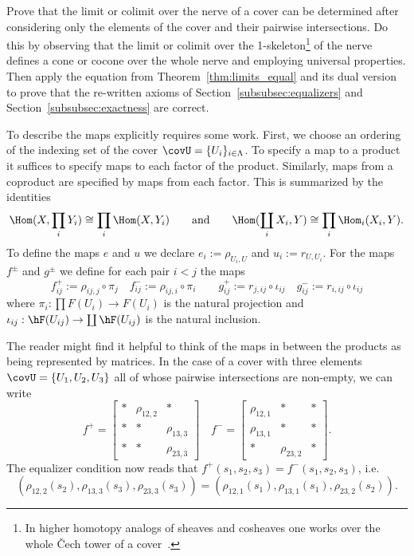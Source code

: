 \begin{exr}
Prove that the limit or colimit over the nerve of a cover can be determined after considering only the elements of the cover and their pairwise intersections. Do this by observing that the limit or colimit over the 1-skeleton\footnote{In higher homotopy analogs of sheaves and cosheaves one works over the whole \v{C}ech tower of a cover~\cite{dugger-hypercovers,douglas2007sheaves,gwilliam-stacks}.} of the nerve defines a cone or cocone over the whole nerve and employing universal properties. Then apply the equation from Theorem~\ref{thm:limits_equal} and its dual version to prove that the re-written axioms of Section~\ref{subsubsec:equalizers} and Section~\ref{subsubsec:exactness} are correct.
\end{exr}

To describe the maps explicitly requires some work. First, we choose an ordering of the indexing set of the cover $\covU=\{U_i\}_{i\in\Lambda}$. To specify a map to a product it suffices to specify maps to each factor of the product. Similarly, maps from a coproduct are specified by maps from each factor. This is summarized by the identities 
	\[
	\Hom(X,\prod_i Y_i)\cong \prod_i\Hom(X,Y_i) \qquad \mathrm{and} \qquad \Hom(\coprod_i X_i,Y)\cong\prod_i \Hom_i(X_i,Y).
	\]
To define the maps $e$ and $u$ we declare $e_i:=\rho_{U_i,U}$ and $u_i:=r_{U,U_i}$. For the maps $f^{\pm}$ and $g^{\pm}$ we define for each pair $i<j$ the maps
	\[
	f^+_{ij}:=\rho_{ij,j}\circ\pi_j \quad f^-_{ij}:=\rho_{ij,i}\circ\pi_i \qquad g^+_{ij}:=r_{j,ij}\circ\iota_{ij} \quad g^-_{ij}:=r_{i,ij}\circ\iota_{ij}
	\]
where $\pi_i:\prod F(U_i)\to F(U_i)$ is the natural projection and $\iota_{ij}:\hF(U_{ij})\to \coprod \hF(U_{ij})$ is the natural inclusion.
	
The reader might find it helpful to think of the maps in between the products as being represented by matrices. In the case of a cover with three elements $\covU=\{U_1,U_2,U_3\}$ all of whose pairwise intersections are non-empty, we can write
	\[
	f^+=\begin{bmatrix} \ast & \rho_{12,2} & \ast  \\  \ast & \ast & \rho_{13,3} \\ \ast & \ast & \rho_{23,3}\end{bmatrix} \quad f^-=\begin{bmatrix} \rho_{12,1} &\ast  &\ast  \\ \rho_{13,1} & \ast  & \ast \\ \ast & \rho_{23,2} &\ast \end{bmatrix}.
	\]
	The equalizer condition now reads that $f^+(s_1,s_2,s_3)=f^-(s_1,s_2,s_3)$, i.e. 
	\[
	(\rho_{12,2}(s_2),\rho_{13,3}(s_3),\rho_{23,3}(s_3))=(\rho_{12,1}(s_1),\rho_{13,1}(s_1),\rho_{23,2}(s_2)).
	\]
	
